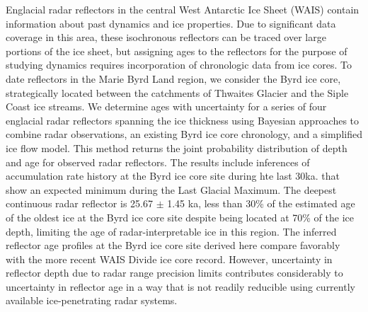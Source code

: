 Englacial radar reflectors in the central West Antarctic Ice Sheet (WAIS) contain information about past dynamics and ice properties. Due to significant data coverage in this area, these isochronous reflectors can be traced over large portions of the ice sheet, but assigning ages to the reflectors for the purpose of studying dynamics requires incorporation of chronologic data from ice cores. To date reflectors in the Marie Byrd Land region, we consider the Byrd ice core, strategically located between the catchments of Thwaites Glacier and the Siple Coast ice streams. We determine ages with uncertainty for a series of four englacial radar reflectors spanning the ice thickness using Bayesian approaches to combine radar observations, an existing Byrd ice core chronology, and a simplified ice flow model. This method returns the joint probability distribution of depth and age for observed radar reflectors. The results include inferences of accumulation rate history at the Byrd ice core site during hte last 30ka. that show an expected minimum during the Last Glacial Maximum. The deepest continuous radar reflector is 25.67 $\pm$ 1.45 ka, less than 30\% of the estimated age of the oldest ice at the Byrd ice core site despite being located at 70\% of the ice depth, limiting the age of radar-interpretable ice in this region. The inferred reflector age profiles at the Byrd ice core site derived here compare favorably with the more recent WAIS Divide ice core record. However, uncertainty in reflector depth due to radar range precision limits contributes considerably to uncertainty in reflector age in a way that is not readily reducible using currently available ice-penetrating radar systems. 
